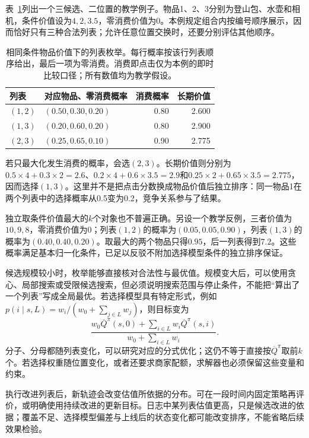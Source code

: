 表~\ref{tab:rs-long-term-slate-example}列出一个三候选、二位置的教学例子。物品1、2、3分别为登山包、水壶和相机，条件价值设为$4,2,3.5$，零消费价值为0。本例规定组合内按编号顺序展示，因而恰好只有三种合法列表；允许任意位置交换时，还要分别评估其他顺序。

\begin{table}[htbp]
 \centering
 \small
 \begin{tabularx}{\linewidth}{@{}lXrr@{}}
  \toprule
  列表 & 对应物品、零消费概率 & 消费概率 & 长期价值 \\
  \midrule
  $(1,2)$ & $(0.50,0.30,0.20)$ & 0.80 & 2.600 \\
  $(1,3)$ & $(0.20,0.60,0.20)$ & 0.80 & 2.900 \\
  $(2,3)$ & $(0.25,0.65,0.10)$ & 0.90 & 2.775 \\
  \bottomrule
 \end{tabularx}
 \caption{相同条件物品价值下的列表枚举。每行概率按该行列表顺序给出，最后一项为零消费。消费即点击仅为本例的即时比较口径；所有数值均为教学假设。}
 \label{tab:rs-long-term-slate-example}
\end{table}

若只最大化发生消费的概率，会选$(2,3)$。长期价值则分别为$0.5\times4+0.3\times2=2.6$、$0.2\times4+0.6\times3.5=2.9$和$0.25\times2+0.65\times3.5=2.775$，因而选择$(1,3)$。这里并不是把点击分数换成物品价值后独立排序：同一物品1在两个列表中的选择概率从0.5变为0.2，竞争关系参与了结果。

独立取条件价值最大的$k$个对象也不普遍正确。另设一个教学反例，三者价值为$10,9,8$，零消费价值为0；列表$(1,2)$的概率为$(0.05,0.05,0.90)$，列表$(1,3)$的概率为$(0.40,0.40,0.20)$。取最大的两个物品只得$0.95$，后一列表得到$7.2$。这些概率满足基本归一化条件，已足以反驳不附加选择模型条件的独立排序保证。

候选规模较小时，枚举能够直接核对合法性与最优值。规模变大后，可以使用贪心、局部搜索或受限候选搜索，但必须说明搜索范围与停止条件，不能把“算出了一个列表”写成全局最优。若选择模型具有特定形式，例如$p(i\mid s,L)=w_i/(w_0+\sum_{j\in L}w_j)$，则目标变为
\[
 \frac{w_0\overline Q^\pi(s,0)
       +\sum_{i\in L}w_i\overline Q^\pi(s,i)}
      {w_0+\sum_{i\in L}w_i}.
\]
分子、分母都随列表变化，可以研究对应的分式优化；这仍不等于直接按$\overline Q^\pi$取前$k$个。若选择权重随位置变化，或者还要求商家配额，求解器也必须保留这些变量和约束。

执行改进列表后，新轨迹会改变估值所依据的分布。可在一段时间内固定策略再评价，或明确使用持续改进的更新目标。日志中某列表估值更高，只是候选改进的依据；覆盖不足、选择模型偏差与上线后的状态变化都可能改变排序，不能省略后续效果检验。

